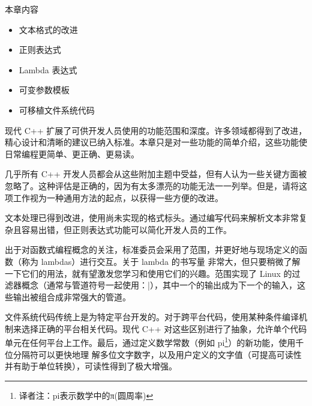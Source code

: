 本章内容

\begin{itemize}
\item
文本格式的改进

\item
正则表达式

\item
Lambda 表达式

\item
可变参数模板

\item
可移植文件系统代码
\end{itemize}

现代 C++ 扩展了可供开发人员使用的功能范围和深度。许多领域都得到了改进，精心设计和清晰的建议已纳入标准。本章只是对一些功能的简单介绍，这些功能使日常编程更简单、更正确、更易读。

几乎所有 C++ 开发人员都会从这些附加主题中受益，但有人认为一些关键方面被忽略了。这种评估是正确的，因为有太多漂亮的功能无法一一列举。但是，请将这项工作视为一种通用方法的起点，以获得一些方便的改进。

文本处理已得到改进，使用尚未实现的格式标头。通过编写代码来解析文本非常复杂且容易出错，但正则表达式功能可以简化开发人员的工作。

出于对函数式编程概念的关注，标准委员会采用了范围，并更好地与现场定义的函数（称为 lambdas）进行交互。关于 lambda 的书写量 非常大，但只要稍微了解一下它们的用法，就有望激发您学习和使用它们的兴趣。范围实现了 Linux 的过滤器概念（通常与管道符号一起使用：|），其中一个的输出成为下一个的输入，这些输出被组合成非常强大的管道。

文件系统代码传统上是为特定平台开发的。对于跨平台代码，使用某种条件编译机制来选择正确的平台相关代码。现代 C++ 对这些区别进行了抽象，允许单个代码单元在任何平台上工作。最后，通过定义数学常数（例如 pi\footnote{译者注：pi表示数学中的π(圆周率)}）的新功能，使用千位分隔符可以更快地理 解多位文字数字，以及用户定义的文字值（可提高可读性并有助于单位转换），可读性得到了极大增强。











